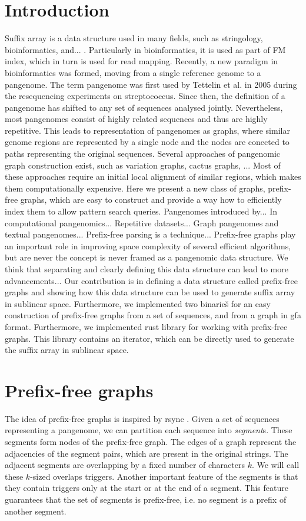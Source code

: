 \documentclass[twocolumn]{ceurart}
\begin{document}
\section{Introduction}
Suffix array is a data structure used in many fields, such as stringology,
bioinformatics, and... .
Particularly in bioinformatics, it is used as part of FM index, which in turn
is used for read mapping.
Recently, a new paradigm in bioinformatics was formed, moving from a single
reference genome to a pangenome.
The term pangenome was first used by Tettelin et al. in 2005 during the
resequencing experiments on streptococcus.
Since then, the definition of a pangenome has shifted to any set of sequences
analysed jointly.
Nevertheless, most pangenomes consist of highly related sequences and thus are
highly repetitive.
This leads to representation of pangenomes as graphs, where similar genome
regions are represented by a single node and the nodes are conected to paths
representing the original sequences.
Several approaches of pangenomic graph construction exist, such as variation
graphs, cactus graphs, ...
Most of these approaches require an initial local alignment of similar regions,
which makes them computationally expensive.
Here we present a new class of graphs, prefix-free graphs, which are easy to
construct and provide a way how to efficiently index them to allow pattern 
search queries.
Pangenomes introduced by...
In computational pangenomics...
Repetitive datasets...
Graph pangenomes and textual pangenomes...
Prefix-free parsing is a technique...
Prefix-free graphs play an important role in improving space
complexity of several efficient algorithms, but are never the concept is never
framed as a pangenomic data structure.
We think that separating and clearly defining this data structure can lead to
more advancements...
Our contribution is in defining a data structure called prefix-free graphs and
showing how this data structure can be used to generate suffix array in
sublinear space.
Furthermore, we implemented two binarieš for an easy construction of prefix-free
graphs from a set of sequences, and from a graph in gfa format.
Furthermore, we implemented rust library for working with prefix-free graphs.
This library contains an iterator, which can be directly used to generate the 
suffix array in sublinear space.

\section{Prefix-free graphs}
The idea of prefix-free graphs is inspired by rsync \cite{}.
Given a set of sequences representing a pangenome, we can partition each
sequence into \emph{segment}s.
These segments form nodes of the prefix-free graph.
The edges of a graph represent the adjacencies of the segment pairs, which are 
present in the original strings.
The adjacent segments are overlapping by a fixed number of characters $k$.
We will call these $k$-sized overlaps triggers.
Another important feature of the segments is that they contain triggers only at
the start or at the end of a segment.
This feature guarantees that the set of segments is prefix-free, i.e. no
segment is a prefix of another segment.
\end{document}
